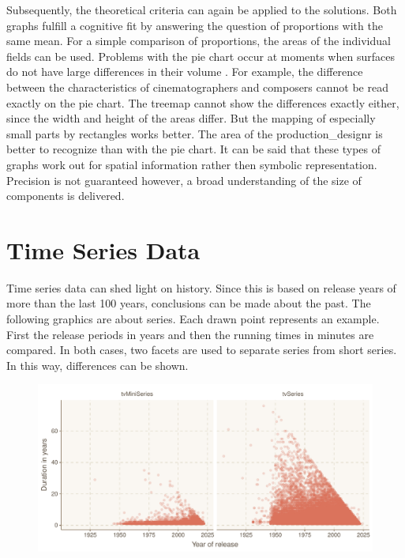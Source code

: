Subsequently, the theoretical criteria can again be applied to the solutions. Both graphs fulfill a cognitive fit by answering the question of proportions with the same mean. For a simple comparison of proportions, the areas of the individual fields can be used. Problems with the pie chart occur at moments when surfaces do not have large differences in their volume \citep{schonlau2008}. For example, the difference between the characteristics of cinematographers and composers cannot be read exactly on the pie chart. The treemap cannot show the differences exactly either, since the width and height of the areas differ. But the mapping of especially small parts by rectangles works better. The area of the production\_designr is better to recognize than with the pie chart. It can be said that these types of graphs work out for spatial information rather then symbolic representation. Precision is not guaranteed however, a broad understanding of the size of components is delivered.

\section{Time Series Data}

Time series data can shed light on history. Since this is based on release years of more than the last 100 years, conclusions can be made about the past. The following graphics are about series. Each drawn point represents an example. First the release periods in years and then the running times in minutes are compared. In both cases, two facets are used to separate series from short series. In this way, differences can be shown. 

\begin{figure}[caption={Periods of broadcasting series}, label={fig:dur}]
	{\includegraphics[width=14.5cm]{figures/ts_dur.pdf}}
\end{figure} 

